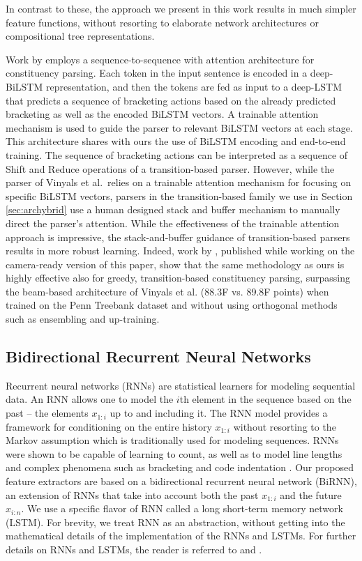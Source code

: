 \documentclass[11pt]{article}
\begin{document}
In contrast to these, the approach we present in this work results in much
simpler feature functions, without resorting to elaborate network architectures or compositional tree representations.

Work by  employs a
sequence-to-sequence with attention architecture for constituency parsing.
Each token in the input sentence is encoded in a deep-BiLSTM representation, and
then the tokens are fed as input to a deep-LSTM that predicts a sequence of
bracketing actions based on the already predicted bracketing as well as the encoded BiLSTM
vectors. A trainable attention mechanism is used to guide the parser to relevant
\mbox{BiLSTM} vectors at each stage.  This architecture shares with ours the use of
BiLSTM encoding and end-to-end training.  The sequence of bracketing actions
can be interpreted as a sequence of Shift and Reduce operations of a transition-based parser. However, while the
parser of Vinyals et al.\ relies on a trainable attention mechanism for focusing on specific 
BiLSTM vectors, parsers in the transition-based family we use in Section
\ref{sec:archybrid} use a human designed stack and buffer mechanism to manually direct the
parser's attention.  While the effectiveness of the trainable attention approach
is impressive, the stack-and-buffer guidance of transition-based parsers results
in more robust learning.
Indeed, work by , published while working on the camera-ready
version of this paper, show that the same methodology as ours is highly effective also for
greedy, transition-based constituency parsing, surpassing the beam-based architecture of
Vinyals et al. (88.3F vs. 89.8F points) when trained on the Penn Treebank dataset and without
using orthogonal methods such as ensembling and up-training.

\subsection{Bidirectional Recurrent Neural Networks}
\label{subsec:birnn}
Recurrent neural networks (RNNs) are statistical
learners for modeling sequential data. An RNN allows one to model the $i$th element in the sequence
based on the past -- the elements $x_{1:i}$ up to and including it. The RNN model provides a framework for
conditioning on the entire history $x_{1:i}$ without resorting to the Markov assumption
which is traditionally used for modeling sequences. RNNs were shown to be
capable of learning to count, as well as to model line lengths and complex
phenomena such as bracketing and code indentation \cite{karpathy2015visualizing}.
Our proposed feature extractors are based on a bidirectional recurrent neural network
(BiRNN), an extension of RNNs that take into account both the past $x_{1:i}$ and the
future $x_{i:n}$.  We use a specific flavor of RNN called a
long short-term memory network (LSTM).
For brevity, we treat RNN as an abstraction, without getting
into the mathematical details of the implementation of the RNNs and LSTMs.  For
further details on RNNs and LSTMs, the reader is referred to
 and .
\end{document}
